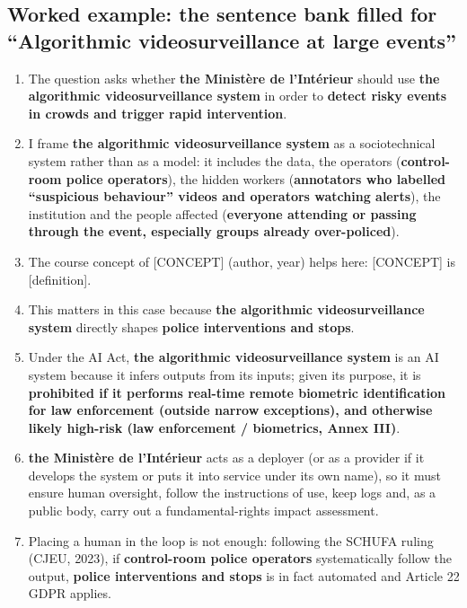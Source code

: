 \documentclass[11pt,a4paper]{article}
\begin{document}
\subsection*{Worked example: the sentence bank filled for “Algorithmic videosurveillance at large events”}\begin{enumerate}[leftmargin=1.6em]
\item The question asks whether \textcolor{tipc}{\textbf{the Ministère de l’Intérieur}} should use \textcolor{tipc}{\textbf{the algorithmic videosurveillance system}} in order to \textcolor{tipc}{\textbf{detect risky events in crowds and trigger rapid intervention}}.
\item I frame \textcolor{tipc}{\textbf{the algorithmic videosurveillance system}} as a sociotechnical system rather than as a model: it includes the data, the operators (\textcolor{tipc}{\textbf{control-room police operators}}), the hidden workers (\textcolor{tipc}{\textbf{annotators who labelled “suspicious behaviour” videos and operators watching alerts}}), the institution and the people affected (\textcolor{tipc}{\textbf{everyone attending or passing through the event, especially groups already over-policed}}).
\item The course concept of [CONCEPT] (author, year) helps here: [CONCEPT] is [definition].
\item This matters in this case because \textcolor{tipc}{\textbf{the algorithmic videosurveillance system}} directly shapes \textcolor{tipc}{\textbf{police interventions and stops}}.
\item Under the AI Act, \textcolor{tipc}{\textbf{the algorithmic videosurveillance system}} is an AI system because it infers outputs from its inputs; given its purpose, it is \textcolor{tipc}{\textbf{prohibited if it performs real-time remote biometric identification for law enforcement (outside narrow exceptions), and otherwise likely high-risk (law enforcement / biometrics, Annex III)}}.
\item \textcolor{tipc}{\textbf{the Ministère de l’Intérieur}} acts as a deployer (or as a provider if it develops the system or puts it into service under its own name), so it must ensure human oversight, follow the instructions of use, keep logs and, as a public body, carry out a fundamental-rights impact assessment.
\item Placing a human in the loop is not enough: following the SCHUFA ruling (CJEU, 2023), if \textcolor{tipc}{\textbf{control-room police operators}} systematically follow the output, \textcolor{tipc}{\textbf{police interventions and stops}} is in fact automated and Article 22 GDPR applies.

\end{enumerate}
\end{document}
